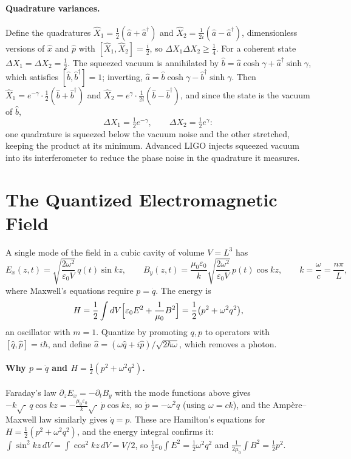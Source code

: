\paragraph{Quadrature variances.} Define the quadratures $\hat{X}_1 = \frac12(\hat{a}+\hat{a}^\dagger)$ and $\hat{X}_2 = \frac{1}{2i}(\hat{a}-\hat{a}^\dagger)$, dimensionless versions of $\hat{x}$ and $\hat{p}$ with $[\hat{X}_1,\hat{X}_2] = \frac i2$, so $\Delta X_1\Delta X_2\ge\frac14$. For a coherent state $\Delta X_1 = \Delta X_2 = \frac12$. The squeezed vacuum is annihilated by $\hat{b} = \hat{a}\cosh\gamma + \hat{a}^\dagger\sinh\gamma$, which satisfies $[\hat{b},\hat{b}^\dagger] = 1$; inverting, $\hat{a} = \hat{b}\cosh\gamma - \hat{b}^\dagger\sinh\gamma$. Then $\hat{X}_1 = e^{-\gamma}\cdot\frac12(\hat{b}+\hat{b}^\dagger)$ and $\hat{X}_2 = e^{\gamma}\cdot\frac{1}{2i}(\hat{b}-\hat{b}^\dagger)$, and since the state is the vacuum of $\hat{b}$,
\[
    \Delta X_1 = \tfrac12e^{-\gamma},
    \qquad
    \Delta X_2 = \tfrac12e^{\gamma}:
\]
one quadrature is squeezed below the vacuum noise and the other stretched, keeping the product at its minimum. Advanced LIGO injects squeezed vacuum into its interferometer to reduce the phase noise in the quadrature it measures.

\section{The Quantized Electromagnetic Field}

A single mode of the field in a cubic cavity of volume $V = L^3$ has
\[
    E_x(z,t) = \sqrt{\frac{2\omega^2}{\varepsilon_0V}}\,q(t)\sin kz,
    \qquad
    B_y(z,t) = \frac{\mu_0\varepsilon_0}{k}\sqrt{\frac{2\omega^2}{\varepsilon_0V}}\,p(t)\cos kz,
    \qquad
    k = \frac\omega c = \frac{n\pi}{L},
\]
where Maxwell's equations require $p = \dot{q}$. The energy is
\[
    H = \frac12\int dV\Bigl[\varepsilon_0E^2 + \frac{1}{\mu_0}B^2\Bigr] = \frac12\bigl(p^2 + \omega^2q^2\bigr),
\]
an oscillator with $m = 1$. Quantize by promoting $q,p$ to operators with $[\hat{q},\hat{p}] = i\hbar$, and define $\hat{a} = (\omega\hat{q} + i\hat{p})/\sqrt{2\hbar\omega}$, which removes a photon.

\paragraph{Why $p = \dot{q}$ and $H = \frac12(p^2+\omega^2q^2)$.} Faraday's law $\partial_zE_x = -\partial_tB_y$ with the mode functions above gives $-k\sqrt{\cdot}\,q\cos kz = -\frac{\mu_0\varepsilon_0}{k}\sqrt{\cdot}\,\dot{p}\cos kz$, so $\dot{p} = -\omega^2q$ (using $\omega = ck$), and the Amp\`ere--Maxwell law similarly gives $\dot{q} = p$. These are Hamilton's equations for $H = \frac12(p^2+\omega^2q^2)$, and the energy integral confirms it: $\int\sin^2kz\,dV = \int\cos^2kz\,dV = V/2$, so $\frac12\varepsilon_0\int E^2 = \frac12\omega^2q^2$ and $\frac{1}{2\mu_0}\int B^2 = \frac12p^2$.


